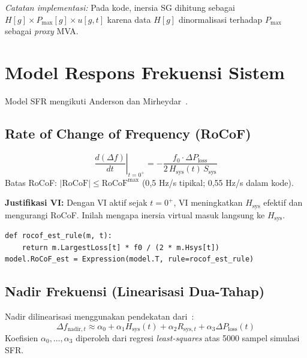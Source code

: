 \documentclass[journal]{IEEEtran}
\newcommand{\Hsys}{H_{\mathrm{sys}}}
\newcommand{\Ploss}{\Delta P_{\mathrm{loss}}}
\newcommand{\RoCoF}{\mathrm{RoCoF}}
\begin{document}
\textit{Catatan implementasi:} Pada kode, inersia SG
dihitung sebagai $H[g] \times P_{\max}[g] \times u[g,t]$
karena data $H[g]$ dinormalisasi terhadap $P_{\max}$
sebagai \textit{proxy} MVA.

\section{Model Respons Frekuensi Sistem}
\label{sec:sfr}

Model SFR mengikuti Anderson dan Mirheydar~\cite{Anderson1990}.

\subsection{Rate of Change of Frequency (RoCoF)}

\begin{equation}
  \left.\frac{d(\Delta f)}{dt}\right|_{t=0^+}
    = -\frac{f_0 \cdot \Ploss}{2\,\Hsys(t)\,S_{\mathrm{sys}}}
  \label{eq:rocof}
\end{equation}
Batas RoCoF: $|\RoCoF| \leq \RoCoF^{\max}$ (0{,}5 Hz/s
tipikal; 0{,}55 Hz/s dalam kode).

\textbf{Justifikasi VI:} Dengan VI aktif sejak $t=0^+$,
VI meningkatkan $\Hsys$ efektif dan mengurangi RoCoF.
Inilah mengapa inersia virtual masuk langsung ke $\Hsys$.

\begin{lstlisting}[style=pycode,caption={Estimasi RoCoF (Cell 25)}]
def rocof_est_rule(m, t):
    return m.LargestLoss[t] * f0 / (2 * m.Hsys[t])
model.RoCoF_est = Expression(model.T, rule=rocof_est_rule)
\end{lstlisting}

\subsection{Nadir Frekuensi (Linearisasi Dua-Tahap)}

Nadir dilinearisasi menggunakan pendekatan dari~\cite{Shi2025}:
\begin{equation}
  \Delta f_{\mathrm{nadir},t} \approx
    \alpha_0 + \alpha_1 \Hsys(t) + \alpha_2 R_{\mathrm{sys},t}
    + \alpha_3 \Ploss(t)
  \label{eq:nadir_linear}
\end{equation}
Koefisien $\alpha_0,\ldots,\alpha_3$ diperoleh dari regresi
\textit{least-squares} atas 5000 sampel simulasi SFR.
\end{document}
